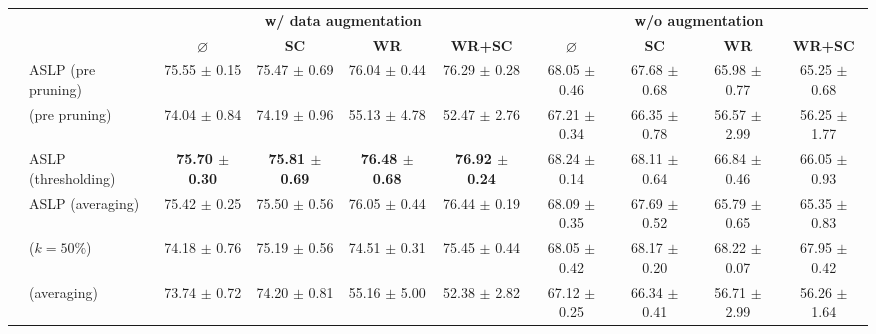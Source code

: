 \begin{table}
  \centering
  \resizebox{16.5cm}{!} {
    \begin{tabular}{llcccccccc}
      \cmidrule[\heavyrulewidth]{3-10}
        &  & \multicolumn{4}{c}{\textbf{w/ data augmentation}} & \multicolumn{4}{c}{\textbf{w/o augmentation}} \\
       &  &  $\varnothing$ & \textbf{SC} & \textbf{WR} & \textbf{WR+SC} & $\varnothing$ & \textbf{SC} & \textbf{WR} & \textbf{WR+SC} \\
      \toprule

      \multirow{18}{*}{} \multirow{6}{*}{\textbf{Conv2}} & ASLP (pre pruning) & 75.55 $\pm$ 0.15 & 75.47 $\pm$ 0.69 & 76.04 $\pm$ 0.44 & 76.29 $\pm$ 0.28 & 68.05 $\pm$ 0.46 & 67.68 $\pm$ 0.68 & 65.98 $\pm$ 0.77 & 65.25 $\pm$ 0.68 \\
        & \cite{DBLP:conf/nips/ZhouLLY19} (pre pruning) & 74.04 $\pm$ 0.84 & 74.19 $\pm$ 0.96 & 55.13 $\pm$ 4.78 & 52.47 $\pm$ 2.76 & 67.21 $\pm$ 0.34 & 66.35 $\pm$ 0.78 & 56.57 $\pm$ 2.99 & 56.25 $\pm$ 1.77 \\
      \cline{2-10}
        & ASLP (thresholding) & \textbf{75.70 $\pm$ 0.30} & \textbf{75.81 $\pm$ 0.69} & \textbf{76.48 $\pm$ 0.68} & \textbf{76.92 $\pm$ 0.24} & 68.24 $\pm$ 0.14 & 68.11 $\pm$ 0.64 & 66.84 $\pm$ 0.46 & 66.05 $\pm$ 0.93 \\
        & ASLP (averaging)& 75.42 $\pm$ 0.25 & 75.50 $\pm$ 0.56 & 76.05 $\pm$ 0.44 & 76.44 $\pm$ 0.19 & 68.09 $\pm$ 0.35 & 67.69 $\pm$ 0.52 & 65.79 $\pm$ 0.65 & 65.35 $\pm$ 0.83 \\
        & \cite{DBLP:conf/cvpr/RamanujanWKFR20} ($k=50\%$) & 74.18 $\pm$ 0.76 & 75.19 $\pm$ 0.56 & 74.51 $\pm$ 0.31 & 75.45 $\pm$ 0.44 & 68.05 $\pm$ 0.42 & 68.17 $\pm$ 0.20 & 68.22 $\pm$ 0.07 & 67.95 $\pm$ 0.42 \\
        & \cite{DBLP:conf/nips/ZhouLLY19} (averaging)& 73.74 $\pm$ 0.72 & 74.20 $\pm$ 0.81 & 55.16 $\pm$ 5.00 & 52.38 $\pm$ 2.82 & 67.12 $\pm$ 0.25 & 66.34 $\pm$ 0.41 & 56.71 $\pm$ 2.99 & 56.26 $\pm$ 1.64 \\
      \midrule


\end{tabular}}
\end{table}
